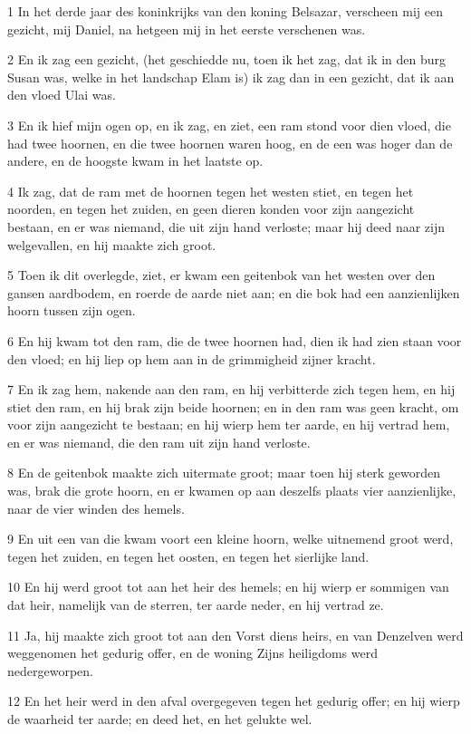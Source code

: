 \par 1 In het derde jaar des koninkrijks van den koning Belsazar, verscheen mij een gezicht, mij Daniel, na hetgeen mij in het eerste verschenen was.
\par 2 En ik zag een gezicht, (het geschiedde nu, toen ik het zag, dat ik in den burg Susan was, welke in het landschap Elam is) ik zag dan in een gezicht, dat ik aan den vloed Ulai was.
\par 3 En ik hief mijn ogen op, en ik zag, en ziet, een ram stond voor dien vloed, die had twee hoornen, en die twee hoornen waren hoog, en de een was hoger dan de andere, en de hoogste kwam in het laatste op.
\par 4 Ik zag, dat de ram met de hoornen tegen het westen stiet, en tegen het noorden, en tegen het zuiden, en geen dieren konden voor zijn aangezicht bestaan, en er was niemand, die uit zijn hand verloste; maar hij deed naar zijn welgevallen, en hij maakte zich groot.
\par 5 Toen ik dit overlegde, ziet, er kwam een geitenbok van het westen over den gansen aardbodem, en roerde de aarde niet aan; en die bok had een aanzienlijken hoorn tussen zijn ogen.
\par 6 En hij kwam tot den ram, die de twee hoornen had, dien ik had zien staan voor den vloed; en hij liep op hem aan in de grimmigheid zijner kracht.
\par 7 En ik zag hem, nakende aan den ram, en hij verbitterde zich tegen hem, en hij stiet den ram, en hij brak zijn beide hoornen; en in den ram was geen kracht, om voor zijn aangezicht te bestaan; en hij wierp hem ter aarde, en hij vertrad hem, en er was niemand, die den ram uit zijn hand verloste.
\par 8 En de geitenbok maakte zich uitermate groot; maar toen hij sterk geworden was, brak die grote hoorn, en er kwamen op aan deszelfs plaats vier aanzienlijke, naar de vier winden des hemels.
\par 9 En uit een van die kwam voort een kleine hoorn, welke uitnemend groot werd, tegen het zuiden, en tegen het oosten, en tegen het sierlijke land.
\par 10 En hij werd groot tot aan het heir des hemels; en hij wierp er sommigen van dat heir, namelijk van de sterren, ter aarde neder, en hij vertrad ze.
\par 11 Ja, hij maakte zich groot tot aan den Vorst diens heirs, en van Denzelven werd weggenomen het gedurig offer, en de woning Zijns heiligdoms werd nedergeworpen.
\par 12 En het heir werd in den afval overgegeven tegen het gedurig offer; en hij wierp de waarheid ter aarde; en deed het, en het gelukte wel.
